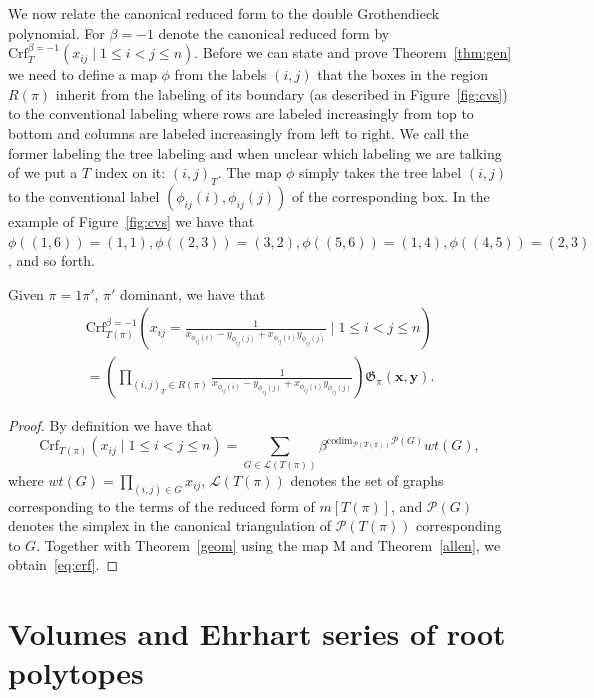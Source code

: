 \documentclass[ALCO,ThmDefs]{cedram}
\numberwithin{equation}{section}
\newcommand*{\Crf}{\mathrm{Crf}}
\renewcommand*\P{{\mathcal{P}}}
\newcommand*\+{\smash{\lower2pt\hbox{\rlap{\vrule height14pt}}\raise2pt\hbox{\rlap{\hskip-3pt \vrule height.4pt depth0pt width14.7pt}}}}
\begin{document}
We now relate the canonical reduced form to the double Grothendieck polynomial. For $\beta=-1$ denote the canonical reduced form by $\Crf^{\beta=-1}_T(x_{ij} \mid 1\leq i<j\leq n)$. Before we can state and prove Theorem~\ref{thm:gen} we need to define a map $\phi$ from the labels $(i,j)$ that the boxes in the region $R(\pi)$ inherit from the labeling of its boundary (as described in Figure~\ref{fig:cvs}) to the conventional labeling where rows are labeled increasingly from top to bottom and columns are labeled increasingly from left to right. We call the former labeling the tree labeling and when unclear which labeling we are talking of we put a $T$ index on it: $(i,j)_T$. The map $\phi$ simply takes the tree label $(i,j)$ to the conventional label $(\phi_{ij}(i), \phi_{ij}(j))$ of the corresponding box. In the example of Figure~\ref{fig:cvs} we have that $\phi((1,6))=(1,1), \phi((2,3))=(3,2), \phi((5,6))=(1,4), \phi((4,5))=(2,3)$, and so forth.

\begin{theo}\label{thm:gen}
Given $\pi=1\pi'$, $\pi'$ dominant, we have that
\begin{multline}\label{eq:crf}
\Crf^{\beta=-1}_{T(\pi)}\left(x_{ij}=\frac{1}{x_{\phi_{ij}(i)}-y_{\phi_{ij}(j)}+x_{\phi_{ij}(i)}y_{\phi_{ij}(j)}} \mid 1\leq i<j\leq n\right)
\\=\left(\prod_{(i,j)_T \in R(\pi)} \frac{1}{x_{\phi_{ij}(i)}-y_{\phi_{ij}(j)}+x_{\phi_{ij}(i)}y_{\phi_{ij}(j)}}\right) \mathfrak{G}_{\pi}(\mathbf{x, y}).
\end{multline}
\end{theo}

\begin{proof}
By definition we have that
\begin{equation}
\Crf_{T(\pi)}(x_{ij} \mid 1\leq i<j\leq n)=\sum_{G \in {\mathcal{L}}(T(\pi))}\beta^{\mathrm{codim}_{\P(T(\pi))}\P(G)} wt(G),
\end{equation}
where $wt(G)=\prod_{(i,j)\in G}x_{ij}$, ${\mathcal{L}}(T(\pi))$ denotes the set of graphs corresponding to the terms of the reduced form of $m[T(\pi)]$, and $\P(G)$ denotes the simplex in the canonical triangulation of $\P(T(\pi))$ corresponding to $G$. Together with Theorem~\ref{geom} using the map M and Theorem~\ref{allen}, we obtain~\eqref{eq:crf}.
\end{proof}


\section{Volumes and Ehrhart series of root polytopes}\label{sec:cor}
\end{document}
